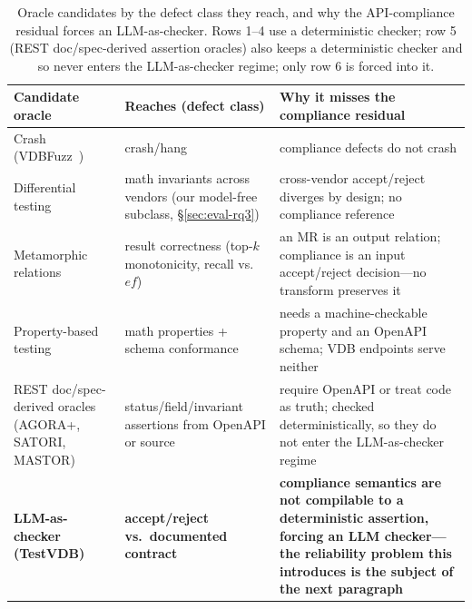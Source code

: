 \documentclass[sigconf]{acmart}
\begin{document}
\begin{table}[t]
\caption{Oracle candidates by the defect class they reach, and why the API-compliance residual forces an LLM-as-checker. Rows 1--4 use a deterministic checker; row 5 (REST doc/spec-derived assertion oracles) also keeps a deterministic checker and so never enters the LLM-as-checker regime; only row 6 is forced into it.}
\label{tab:exclusion}
\small
\begin{tabular}{@{}p{}p{}p{}@{}}
\toprule
Candidate oracle & Reaches (defect class) & Why it misses the compliance residual \\
\midrule
Crash (VDBFuzz~\cite{vdbfuzz26}) & crash/hang & compliance defects do not crash \\
Differential testing & math invariants across vendors (our model-free subclass, \S\ref{sec:eval-rq3}) & cross-vendor accept/reject diverges by design; no compliance reference~\cite{roadmap25} \\
Metamorphic relations~\cite{metmap24} & result correctness (top-$k$ monotonicity, recall vs.\ $ef$) & an MR is an output relation; compliance is an input accept/reject decision---no transform preserves it \\
Property-based testing~\cite{claessen00,schemathesis,quickrest20} & math properties + schema conformance & needs a machine-checkable property and an OpenAPI schema; VDB endpoints serve neither \\
REST doc/spec-derived oracles (AGORA+, SATORI, MASTOR) & status/field/invariant assertions from OpenAPI or source & require OpenAPI or treat code as truth; checked deterministically, so they do not enter the LLM-as-checker regime \\
\textbf{LLM-as-checker (TestVDB)} & \textbf{accept/reject vs.\ documented contract} & \textbf{compliance semantics are not compilable to a deterministic assertion, forcing an LLM checker---the reliability problem this introduces is the subject of the next paragraph} \\
\bottomrule
\end{tabular}
\end{table}
\end{document}
